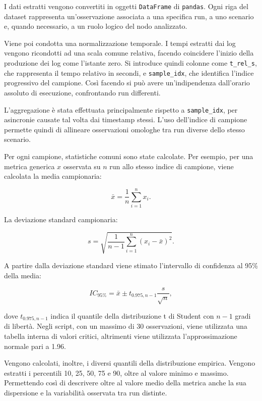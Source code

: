 I dati estratti vengono convertiti in oggetti \texttt{DataFrame} di
\texttt{pandas}. Ogni riga del dataset rappresenta un'osservazione associata a
una specifica run, a uno scenario e, quando necessario, a un ruolo logico del
nodo analizzato.


Viene poi condotta una normalizzazione temporale. I tempi estratti dai log vengono
ricondotti ad una scala comune relativa, facendo coincidere l'inizio della produzione
dei log come l'istante zero. Si introduce quindi colonne come
\texttt{t\_rel\_s}, che rappresenta il tempo relativo in secondi, e
\texttt{sample\_idx}, che identifica l'indice progressivo del campione. 
Così facendo si può avere un'indipendenza dall'orario assoluto di esecuzione, 
confrontando run differenti.

L'aggregazione è stata effettuata principalmente rispetto a \texttt{sample\_idx},
per asincronie causate tal volta dai timestamp stessi. L'uso dell'indice di campione
permette quindi di allineare osservazioni omologhe tra run diverse dello stesso
scenario.

Per ogni campione, statistiche comuni sono state calcolate.
Per esempio, per una metrica generica $x$ osservata su $n$ run allo stesso
indice di campione, viene calcolata la media campionaria:

\[
  \bar{x} = \frac{1}{n}\sum_{i=1}^{n} x_i .
\]

La deviazione standard campionaria:

\[
  s = \sqrt{\frac{1}{n-1}\sum_{i=1}^{n}(x_i-\bar{x})^2}.
\]

A partire dalla deviazione standard viene stimato l'intervallo di confidenza al
95\% della media:

\[
  IC_{95\%}
  =
  \bar{x}
  \pm
  t_{0.975,n-1}\frac{s}{\sqrt{n}},
\]

dove $t_{0.975,n-1}$ indica il quantile della distribuzione t di Student con
$n-1$ gradi di libertà. 
Negli script, con un massimo di 30 osservazioni, viene utilizzata una tabella
interna di valori critici, altrimenti viene utilizzata l'approssimazione
normale pari a 1.96.

Vengono calcolati, inoltre, i diversi quantili della distribuzione empirica. 
Vengono estratti i percentili 10, 25, 50, 75 e 90, oltre al valore minimo e 
massimo. Permettendo così di descrivere oltre al valore medio della metrica
anche la sua dispersione e la variabilità osservata tra run distinte.

